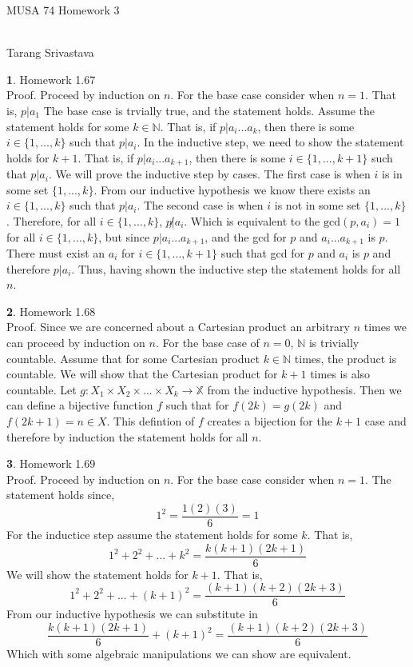 \documentclass[10pt, twocolumn]{article}
\author{Tarang Srivastava}
\newcommand{\makechaptertitle}[1]{
\begin{center}
	\begin{large}
		#1
	\end{large}
	\begin{small}
		\\Tarang Srivastava
	\end{small}
\end{center}
}
\theoremstyle{definition}
\newtheorem{q}{}
\begin{document}
	
\makechaptertitle{MUSA 74 Homework 3}

\begin{q}
Homework 1.67 \\
Proof. Proceed by induction on $ n $. For the base case consider when $ n = 1 $. That is, $ p|a_1 $
The base case is trvially true, and the statement holds.
Assume the statement holds for some $ k \in \mathbb{N} $.
That is, if $ p|a_i...a_k $, then there is some $ i \in \{1, ..., k\} $ such that $ p|a_i $.
In the inductive step, we need to show the statement holds for $ k + 1 $.
That is, if $ p|a_i...a_{k+1} $, then there is some $ i \in \{1, ..., k+1\} $ such that $ p|a_i $.
We will prove the inductive step by cases.
The first case is when $ i $ is in some set $ \{1, ..., k\} $.
From our inductive hypothesis we know there exists an $ i \in \{1, ..., k\} $ 
such that $ p|a_i $. 
The second case is when $ i $ is not in some set $ \{1, ..., k\} $.
Therefore, for all $ i \in \{1, ..., k\} $, $ p \not | a_i $. 
Which is equivalent to the $ \text{gcd}(p, a_i) = 1 $ for all $ i \in \{1, ..., k\} $, 
but since $ p|a_i...a_{k+1} $, and the gcd for $ p $ and $ a_i...a_{k+1} $ is $ p $. 
There must exist an $ a_i $ for $ i \in \{1,...,k+1\} $ such that gcd for $ p $ and $ a_i $ is $ p $ and therefore $ p|a_i $. 
Thus, having shown the inductive step the statement holds for all $ n $.
\end{q}
\begin{q}
Homework 1.68 \\
Proof. Since we are concerned about a Cartesian product an arbitrary $ n $ times we can proceed by induction on $ n $. 
For the base case of $ n = 0 $, $ \mathbb{N} $ is trivially countable.
Assume that for some Cartesian product $ k \in \mathbb{N} $ times, the product is countable.
We will show that the Cartesian product for $ k + 1 $ times is also countable. 
Let $ g: X_1 \times X_2 \times ... \times X_k \rightarrow \mathbb{X} $ from the inductive hypothesis.
Then we can define a bijective function $ f $ such that for $ f(2k) = g(2k) $ and $ f(2k+1) = n \in X $.
This defintion of $ f $ creates a bijection for the $ k + 1 $ case and therefore by induction the statement holds for all $ n $. \\
\end{q}
\begin{q}
Homework 1.69 \\
Proof. Proceed by induction on $ n $.
For the base case consider when $ n = 1$. 
The statement holds since, 
$$ 1^2 = \dfrac{1(2)(3)}{6} = 1 $$
For the inductice step assume the statement holds for some $ k $.
That is,
$$ 1^2 + 2^2 + ... + k^2 = \dfrac{k(k+1)(2k+1)}{6} $$
We will show the statement holds for $ k + 1 $. That is,
$$ 1^2 + 2^2 + ... + (k+1)^2 = \dfrac{(k+1)(k+2)(2k+3)}{6} $$
From our inductive hypothesis we can substitute in 
$$  \dfrac{k(k+1)(2k+1)}{6} + (k+1)^2 = \dfrac{(k+1)(k+2)(2k+3)}{6} $$
Which with some algebraic manipulations we can show are equivalent.
\end{q}
\end{document}
